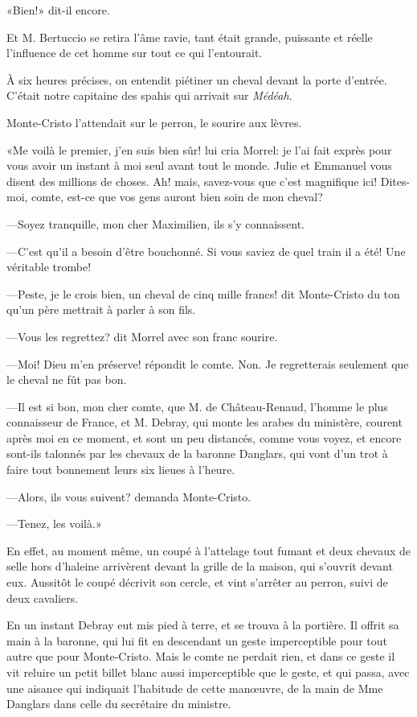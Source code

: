 «Bien!» dit-il encore. 

Et M. Bertuccio se retira l'âme ravie, tant était grande, puissante et réelle l'influence de cet homme sur tout ce qui l'entourait. 

À six heures précises, on entendit piétiner un cheval devant la porte d'entrée. C'était notre capitaine des spahis qui arrivait sur \textit{Médéah}. 

Monte-Cristo l'attendait sur le perron, le sourire aux lèvres. 

«Me voilà le premier, j'en suis bien sûr! lui cria Morrel: je l'ai fait exprès pour vous avoir un instant à moi seul avant tout le monde. Julie et Emmanuel vous disent des millions de choses. Ah! mais, savez-vous que c'est magnifique ici! Dites-moi, comte, est-ce que vos gens auront bien soin de mon cheval? 

—Soyez tranquille, mon cher Maximilien, ils s'y connaissent. 

—C'est qu'il a besoin d'être bouchonné. Si vous saviez de quel train il a été! Une véritable trombe! 

—Peste, je le crois bien, un cheval de cinq mille francs! dit Monte-Cristo du ton qu'un père mettrait à parler à son fils. 

—Vous les regrettez? dit Morrel avec son franc sourire. 

—Moi! Dieu m'en préserve! répondit le comte. Non. Je regretterais seulement que le cheval ne fût pas bon. 

—Il est si bon, mon cher comte, que M. de Château-Renaud, l'homme le plus connaisseur de France, et M. Debray, qui monte les arabes du ministère, courent après moi en ce moment, et sont un peu distancés, comme vous voyez, et encore sont-ils talonnés par les chevaux de la baronne Danglars, qui vont d'un trot à faire tout bonnement leurs six lieues à l'heure. 

—Alors, ils vous suivent? demanda Monte-Cristo. 

—Tenez, les voilà.» 

En effet, au moment même, un coupé à l'attelage tout fumant et deux chevaux de selle hors d'haleine arrivèrent devant la grille de la maison, qui s'ouvrit devant eux. Aussitôt le coupé décrivit son cercle, et vint s'arrêter au perron, suivi de deux cavaliers. 

En un instant Debray eut mis pied à terre, et se trouva à la portière. Il offrit sa main à la baronne, qui lui fit en descendant un geste imperceptible pour tout autre que pour Monte-Cristo. Mais le comte ne perdait rien, et dans ce geste il vit reluire un petit billet blanc aussi imperceptible que le geste, et qui passa, avec une aisance qui indiquait l'habitude de cette manœuvre, de la main de Mme Danglars dans celle du secrétaire du ministre. 

